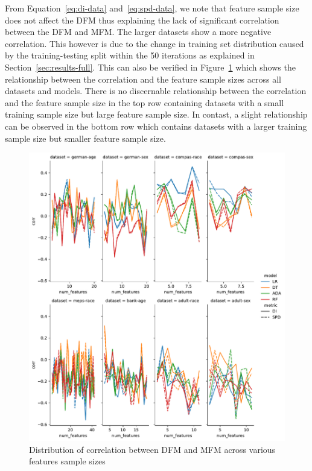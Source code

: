 \documentclass{article}
\begin{document}
From Equation \ref{eq:di-data} and \ref{eq:spd-data}, we note that
feature sample size does not affect the DFM thus explaining the lack
of significant correlation between the DFM and MFM. The larger
datasets show a more negative correlation. This however is due to the
change in training set distribution caused by the training-testing
split within the 50 iterations as explained
in Section \ref{sec:results-full}. This can also be verified in
Figure \ref{fig:lineplot--num-features--corr} which shows the
relationship between the correlation and the feature sample sizes
across all datasets and models. There is no discernable relationship
between the correlation and the feature sample size in the top row
containing datasets with a small training sample size but large
feature sample size. In contast, a slight relationship can be observed
in the bottom row which contains datasets with a larger training
sample size but smaller feature sample size.

\begin{figure}
  \centering
  \includegraphics[width=0.95\linewidth]{lineplot--num-features--corr.pdf}
  \caption{Distribution of correlation between DFM and MFM across
    various features sample sizes}
  \label{fig:lineplot--num-features--corr}
\end{figure}
\end{document}
